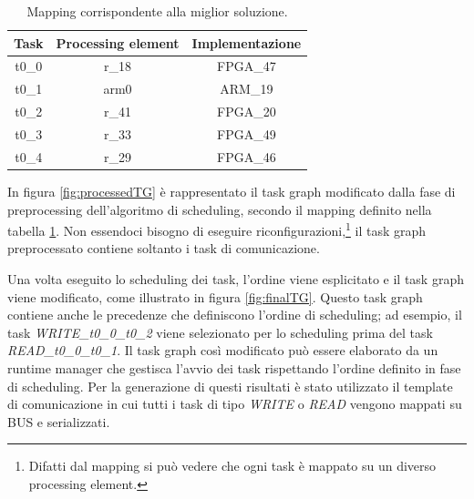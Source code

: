 \begin{table}[tb]
 \begin{center}
  \begin{tabular}{|c|c|c|}
   \hline
   \textbf{Task} & \textbf{Processing element} & \textbf{Implementazione}\\
   \hline
   t0\_0 & r\_18 & FPGA\_47\\
   \hline
   t0\_1 & arm0 & ARM\_19\\
   \hline
   t0\_2 & r\_41 & FPGA\_20\\
   \hline
   t0\_3 & r\_33 & FPGA\_49\\
   \hline
   t0\_4 & r\_29 & FPGA\_46\\
   \hline
  \end{tabular}
  \caption{Mapping corrispondente alla miglior soluzione.}
  \label{tab:bestMapping}
 \end{center}
\end{table}

In figura \ref{fig:processedTG} \`e rappresentato il task graph modificato dalla fase
di preprocessing dell'algoritmo di scheduling, secondo il mapping definito nella tabella
\ref{tab:bestMapping}. Non essendoci bisogno di eseguire riconfigurazioni,\footnote{Difatti
dal mapping si pu\`o vedere che ogni task \`e mappato su un diverso processing element.}
il task graph preprocessato contiene soltanto i task di comunicazione.

Una volta eseguito lo scheduling dei task, l'ordine viene esplicitato
e il task graph viene modificato, come illustrato in figura \ref{fig:finalTG}.
Questo task graph contiene anche le precedenze che definiscono l'ordine di scheduling;
ad esempio, il task \emph{WRITE\_t0\_0\_t0\_2} viene selezionato per lo scheduling prima del task
\emph{READ\_t0\_0\_t0\_1}. Il task graph cos\`i modificato pu\`o essere elaborato da un runtime
manager che gestisca l'avvio dei task rispettando l'ordine definito in fase di scheduling.
Per la generazione di questi risultati \`e stato utilizzato il template di comunicazione
in cui tutti i task di tipo \emph{WRITE} o \emph{READ} vengono mappati su BUS e serializzati.

